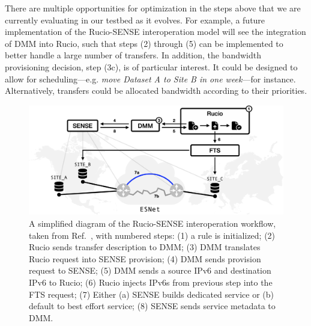 There are multiple opportunities for optimization in the steps above that we are currently evaluating in our testbed as it evolves. 
For example, a future implementation of the Rucio-SENSE interoperation model will see the integration of DMM into Rucio, such that steps (2) through (5) can be implemented to better handle a large number of transfers.
In addition, the bandwidth provisioning decision, step (3c), is of particular interest. 
It could be designed to allow for scheduling---e.g. \textit{move Dataset A to Site B in one week}---for instance. 
Alternatively, transfers could be allocated bandwidth according to their priorities. 

\begin{figure}[htb]
    \centering
    \includegraphics[width=.9\textwidth]{fig/cyber/rucio-sense_basic.png}
    \caption[Rucio-SENSE interoperation workflow]{
        A simplified diagram of the Rucio-SENSE interoperation workflow, taken from Ref.~\cite{Guiang:2022tgi}, with numbered steps: 
        (1) a rule is initialized; 
        (2) Rucio sends transfer description to DMM; 
        (3) DMM translates Rucio request into SENSE provision; 
        (4) DMM sends provision request to SENSE; 
        (5) DMM sends a source IPv6 and destination IPv6 to Rucio;
        (6) Rucio injects IPv6s from previous step into the FTS request;
        (7) Either (a) SENSE builds dedicated service or (b) default to best effort service; 
        (8) SENSE sends service metadata to DMM.
    }
    \label{fig:rucio_sense_basic}
\end{figure}

